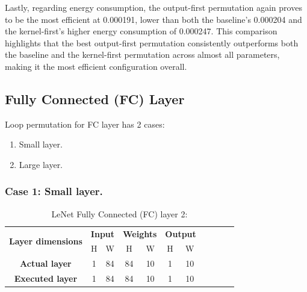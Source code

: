 Lastly, regarding energy consumption, the output-first permutation again proves to be the most efficient at 0.000191, lower than both the baseline’s 0.000204 and the kernel-first’s higher energy consumption of 0.000247. This comparison highlights that the best output-first permutation consistently outperforms both the baseline and the kernel-first permutation across almost all parameters, making it the most efficient configuration overall.

\subsection{Fully Connected (FC) Layer}

Loop permutation for FC layer has 2 cases:
\begin{enumerate}
 \item Small layer.
 \item Large layer.
\end{enumerate}

\subsubsection{Case 1: Small layer.}

\begin{table}[H]
\centering
\caption{LeNet Fully Connected (FC) layer 2:}
\label{tab:permFcCase1Dim}
 \begin{tabular}{|c|c|c|c|c|c|c|c|c|c|c|} \hline  
 
 \multirow{2}{*}{\textbf{Layer dimensions}} &  
 \multicolumn{2}{|c|}{\textbf{Input}} &  
 \multicolumn{2}{|c|}{\textbf{Weights}} &  
 \multicolumn{2}{|c|}{\textbf{Output}}\\ \cline{2-7}
 & H &  W &  H &  W & H &  W\\ \hline  
 \textbf{Actual layer} &  1 &  84 & 84 & 10 & 1 & 10 \\ \hline 
 \textbf{Executed layer} &  1 &  84 & 84 & 10 & 1 & 10 \\ \hline 
 \end{tabular}
\end{table}

